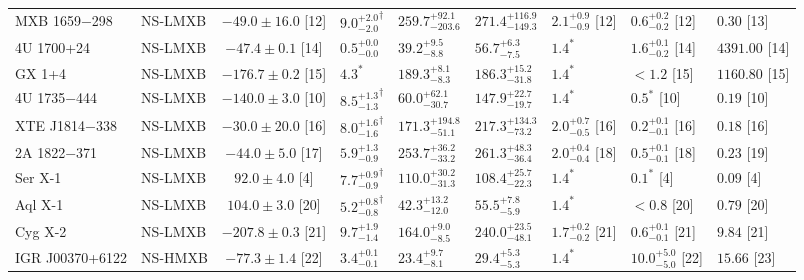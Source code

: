 \begin{table*}
\begin{adjustbox}{width=0.98\textwidth}
\begin{threeparttable}
\begin{tabular}{llcllllll}
      MXB 1659$-$298       & NS-LMXB  & $ -49.0\pm 16.0$ [12]  & ${9.0^{+2.0}_{-2.0}}^\dag$  & $259.7^{+92.1}_{-203.6}$  & $271.4^{+116.9}_{-149.3}$ & $2.1^{+0.9}_{-0.9}$ [12]  & $0.6^{+0.2}_{-0.2}$ [12]     & $0.30$ [13]  \\
      4U 1700+24           & NS-LMXB  & $ -47.4\pm  0.1$ [14]  & $0.5^{+0.0}_{-0.0}$         & $39.2^{+9.5}_{-8.8}$      & $56.7^{+6.3}_{-7.5}$      & $1.4^\ast$                & $1.6^{+0.1}_{-0.2}$ [14]     & $4391.00$ [14]  \\
      GX 1+4               & NS-LMXB  & $-176.7\pm  0.2$ [15]  & $4.3^\ast$                  & $189.3^{+8.1}_{-8.3}$     & $186.3^{+15.2}_{-31.8}$   & $1.4^\ast$                & $<1.2$ [15]                  & $1160.80$ [15]  \\
      4U 1735$-$444        & NS-LMXB  & $-140.0\pm  3.0$ [10]  & ${8.5^{+1.3}_{-1.3}}^\dag$  & $60.0^{+62.1}_{-30.7}$    & $147.9^{+22.7}_{-19.7}$   & $1.4^\ast$                & $0.5^\ast$ [10]              & $0.19$ [10]  \\
      XTE J1814$-$338      & NS-LMXB  & $ -30.0\pm 20.0$ [16]  & ${8.0^{+1.6}_{-1.6}}^\dag$  & $171.3^{+194.8}_{-51.1}$  & $217.3^{+134.3}_{-73.2}$  & $2.0^{+0.7}_{-0.5}$ [16]  & $0.2^{+0.1}_{-0.1}$ [16]     & $0.18$ [16]  \\
      2A 1822$-$371        & NS-LMXB  & $ -44.0\pm  5.0$ [17]  & $5.9^{+1.3}_{-0.9}$         & $253.7^{+36.2}_{-33.2}$   & $261.3^{+48.3}_{-36.4}$   & $2.0^{+0.4}_{-0.4}$ [18]  & $0.5^{+0.1}_{-0.1}$ [18]     & $0.23$ [19]  \\
      Ser X-1              & NS-LMXB  & $  92.0\pm  4.0$ [4]   & ${7.7^{+0.9}_{-0.9}}^\dag$  & $110.0^{+30.2}_{-31.3}$   & $108.4^{+25.7}_{-22.3}$   & $1.4^\ast$                & $0.1^\ast$ [4]               & $0.09$ [4]   \\
      Aql X-1              & NS-LMXB  & $ 104.0\pm  3.0$ [20]  & ${5.2^{+0.8}_{-0.8}}^\dag$  & $42.3^{+13.2}_{-12.0}$    & $55.5^{+7.8}_{-5.9}$      & $1.4^\ast$                & $<0.8$ [20]                  & $0.79$ [20]  \\
      Cyg X-2              & NS-LMXB  & $-207.8\pm  0.3$ [21]  & $9.7^{+1.9}_{-1.4}$         & $164.0^{+9.0}_{-8.5}$     & $240.0^{+23.5}_{-48.1}$   & $1.7^{+0.2}_{-0.2}$ [21]  & $0.6^{+0.1}_{-0.1}$ [21]     & $9.84$ [21]  \\
      IGR J00370+6122      & NS-HMXB  & $ -77.3\pm  1.4$ [22]  & $3.4^{+0.1}_{-0.1}$         & $23.4^{+9.7}_{-8.1}$      & $29.4^{+5.3}_{-5.3}$      & $1.4^\ast$                & $10.0^{+5.0}_{-5.0}$ [22]    & $15.66$ [23]  \\

\end{tabular}
\end{threeparttable}
\end{adjustbox}
\end{table*}
